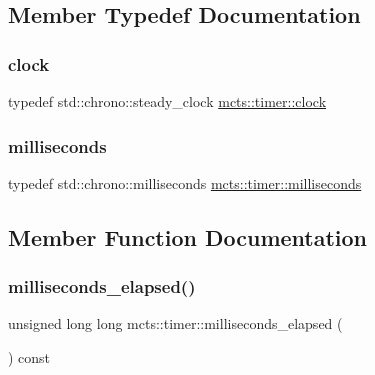 \subsection{Member Typedef Documentation}
\mbox{\label{structmcts_1_1timer_af23a84a48a3fefda5f4feab15335cdfa}} 
\subsubsection{\texorpdfstring{clock}{clock}}
{\footnotesize\ttfamily typedef std\+::chrono\+::steady\+\_\+clock \hyperlink{structmcts_1_1timer_af23a84a48a3fefda5f4feab15335cdfa}{mcts\+::timer\+::clock}}

\mbox{\label{structmcts_1_1timer_afb7f774a789b13dc7cadd5e064a1a247}} 
\subsubsection{\texorpdfstring{milliseconds}{milliseconds}}
{\footnotesize\ttfamily typedef std\+::chrono\+::milliseconds \hyperlink{structmcts_1_1timer_afb7f774a789b13dc7cadd5e064a1a247}{mcts\+::timer\+::milliseconds}}



\subsection{Member Function Documentation}
\mbox{\label{structmcts_1_1timer_af6b8b0201318b987bcab531de4b964f9}} 
\subsubsection{\texorpdfstring{milliseconds\+\_\+elapsed()}{milliseconds\_elapsed()}}
{\footnotesize\ttfamily unsigned long long mcts\+::timer\+::milliseconds\+\_\+elapsed (\begin{DoxyParamCaption}{ }\end{DoxyParamCaption}) const\hspace{0.3cm}{\ttfamily [inline]}}

